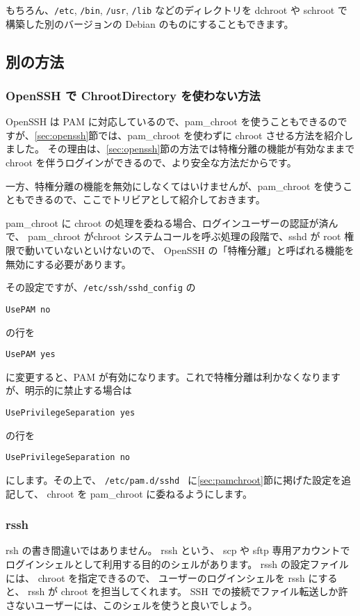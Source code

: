 もちろん、{\tt /etc}, {\tt /bin}, {\tt /usr}, {\tt /lib} などのディレクトリを dchroot や schroot で構築した別のバージョンの Debian のものにすることもできます。



\subsection{別の方法}

\subsubsection{OpenSSH で ChrootDirectory を使わない方法}
OpenSSH は PAM に対応しているので、pam\_chroot を使うこともできるのですが、\ref{sec:openssh}節では、pam\_chroot を使わずに chroot させる方法を紹介しました。
その理由は、\ref{sec:openssh}節の方法では特権分離の機能が有効なままで chroot を伴うログインができるので、より安全な方法だからです。

一方、特権分離の機能を無効にしなくてはいけませんが、pam\_chroot を使うこともできるので、ここでトリビアとして紹介しておきます。

 pam\_chroot に chroot の処理を委ねる場合、ログインユーザーの認証が済んで、
  pam\_chroot がchroot システムコールを呼ぶ処理の段階で、sshd が root 権限で動いていないといけないので、
OpenSSH の「特権分離」と呼ばれる機能を無効にする必要があります。

その設定ですが、{\tt /etc/ssh/sshd\_config} の

{\tt UsePAM no}

の行を

{\tt UsePAM yes}

に変更すると、PAM が有効になります。これで特権分離は利かなくなりますが、明示的に禁止する場合は

{\tt UsePrivilegeSeparation yes}

の行を

{\tt UsePrivilegeSeparation no}

にします。その上で、 {\tt /etc/pam.d/sshd } に\ref{sec:pamchroot}節に掲げた設定を追記して、 chroot を pam\_chroot   に委ねるようにします。

\subsubsection{rssh}
rsh の書き間違いではありません。
rssh という、 scp や sftp 専用アカウントでログインシェルとして利用する目的のシェルがあります。
rssh の設定ファイルには、 chroot を指定できるので、
ユーザーのログインシェルを rssh にすると、 rssh が chroot を担当してくれます。
SSH での接続でファイル転送しか許さないユーザーには、このシェルを使うと良いでしょう。

